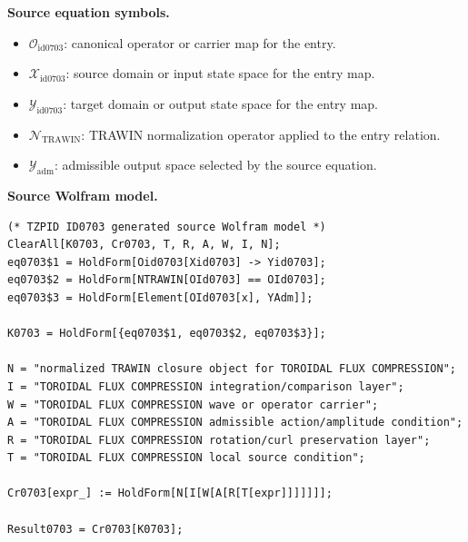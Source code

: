 \begin{minipage}[t]{0.49\linewidth}
\begingroup
\small
\raggedright
\textbf{Source equation symbols.}\par
\begin{itemize}[leftmargin=1.35em,itemsep=1pt,topsep=1pt,parsep=0pt]
    \item $\mathcal{O}_{\mathrm{id0703}}$: canonical operator or carrier map for the entry.
    \item $\mathcal{X}_{\mathrm{id0703}}$: source domain or input state space for the entry map.
    \item $\mathcal{Y}_{\mathrm{id0703}}$: target domain or output state space for the entry map.
    \item $\mathcal{N}_{\mathrm{TRAWIN}}$: TRAWIN normalization operator applied to the entry relation.
    \item $\mathcal{Y}_{\mathrm{adm}}$: admissible output space selected by the source equation.
\end{itemize}
\endgroup
\end{minipage}\hfill
\begin{minipage}[t]{0.47\linewidth}
\begingroup
\scriptsize
\raggedright
\textbf{Source Wolfram model.}\par
\begin{Verbatim}[fontsize=\tiny,breaklines=true,breakanywhere=true]
(* TZPID ID0703 generated source Wolfram model *)
ClearAll[K0703, Cr0703, T, R, A, W, I, N];
eq0703$1 = HoldForm[Oid0703[Xid0703] -> Yid0703];
eq0703$2 = HoldForm[NTRAWIN[OId0703] == OId0703];
eq0703$3 = HoldForm[Element[OId0703[x], YAdm]];

K0703 = HoldForm[{eq0703$1, eq0703$2, eq0703$3}];

N = "normalized TRAWIN closure object for TOROIDAL FLUX COMPRESSION";
I = "TOROIDAL FLUX COMPRESSION integration/comparison layer";
W = "TOROIDAL FLUX COMPRESSION wave or operator carrier";
A = "TOROIDAL FLUX COMPRESSION admissible action/amplitude condition";
R = "TOROIDAL FLUX COMPRESSION rotation/curl preservation layer";
T = "TOROIDAL FLUX COMPRESSION local source condition";

Cr0703[expr_] := HoldForm[N[I[W[A[R[T[expr]]]]]]];

Result0703 = Cr0703[K0703];
\end{Verbatim}
\endgroup
\end{minipage}

